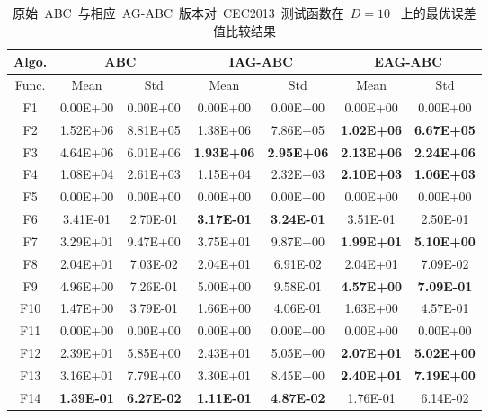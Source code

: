 \renewcommand{\tablename}{附表}                                     %
\renewcommand{\thetable}{A-\arabic{table}}         %


\begin{table*}[!ht]
  \centering
  \caption{原始~ABC~与相应~AG-ABC~版本对~CEC2013~测试函数在~$D=10$~ 上的最优误差值比较结果}
  \scriptsize
    \begin{tabular}{|c|cc|cc|cc|}
    \hline
    Algo.  & \multicolumn{2}{c|}{ABC} & \multicolumn{2}{c|}{IAG-ABC} & \multicolumn{2}{c|}{EAG-ABC} \\
    \hline
    Func.   & Mean  & Std   & Mean  & Std   & Mean  & Std \\  \hline
    F1    & 0.00E+00 & 0.00E+00 & 0.00E+00 & 0.00E+00 & 0.00E+00 & 0.00E+00 \\
    F2    & 1.52E+06 & 8.81E+05 & 1.38E+06 & 7.86E+05 & \textbf{1.02E+06} & \textbf{6.67E+05} \\
    F3    & 4.64E+06 & 6.01E+06 & \textbf{1.93E+06} & \textbf{2.95E+06} & \textbf{2.13E+06} & \textbf{2.24E+06} \\
    F4    & 1.08E+04 & 2.61E+03 & 1.15E+04 & 2.32E+03 & \textbf{2.10E+03} & \textbf{1.06E+03} \\
    F5    & 0.00E+00 & 0.00E+00 & 0.00E+00 & 0.00E+00 & 0.00E+00 & 0.00E+00 \\
    \hline
    F6    & 3.41E-01 & 2.70E-01 & \textbf{3.17E-01} & \textbf{3.24E-01} & 3.51E-01 & 2.50E-01 \\
    F7    & 3.29E+01 & 9.47E+00 & 3.75E+01 & 9.87E+00 & \textbf{1.99E+01} & \textbf{5.10E+00} \\
    F8    & 2.04E+01 & 7.03E-02 & 2.04E+01 & 6.91E-02 & 2.04E+01 & 7.09E-02 \\
    F9    & 4.96E+00 & 7.26E-01 & 5.00E+00 & 9.58E-01 & \textbf{4.57E+00} & \textbf{7.09E-01} \\
    F10   & 1.47E+00 & 3.79E-01 & 1.66E+00 & 4.06E-01 & 1.63E+00 & 4.57E-01 \\
    F11   & 0.00E+00 & 0.00E+00 & 0.00E+00 & 0.00E+00 & 0.00E+00 & 0.00E+00 \\
    F12   & 2.39E+01 & 5.85E+00 & 2.43E+01 & 5.05E+00 & \textbf{2.07E+01} & \textbf{5.02E+00} \\
    F13   & 3.16E+01 & 7.79E+00 & 3.30E+01 & 8.45E+00 & \textbf{2.40E+01} & \textbf{7.19E+00} \\
    F14   & \textbf{1.39E-01} & \textbf{6.27E-02} & \textbf{1.11E-01} & \textbf{4.87E-02} & 1.76E-01 & 6.14E-02 \\

\end{tabular}
\end{table*}
